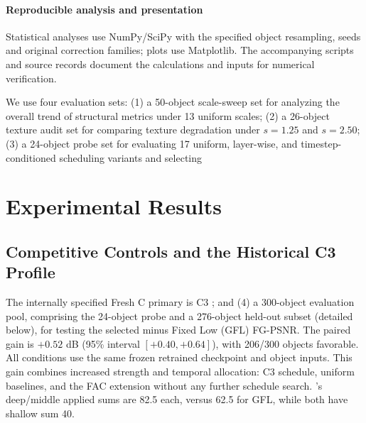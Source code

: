\documentclass[times,twocolumn,final]{elsarticle}
\providecommand{\DIFadd}[1]{{\protect\color{blue} \sf #1}} %
\providecommand{\DIFdel}[1]{{\protect\color{red} \scriptsize #1}} %
\providecommand{\DIFaddbegin}{} %
\providecommand{\DIFaddend}{} %
\providecommand{\DIFdelbegin}{} %
\providecommand{\DIFdelend}{} %
\begin{document}
\DIFdelbegin %
\DIFdelend \DIFaddbegin \paragraph{Reproducible analysis and presentation}
\DIFadd{Statistical analyses use NumPy/SciPy with the specified object resampling, seeds and original correction families; plots use Matplotlib. The accompanying scripts and source records document the calculations and inputs for numerical verification.
}\DIFaddend

\DIFdelbegin \DIFdel{We use four evaluation sets: (1) a 50-object scale-sweep set for analyzing the overall trend of structural metrics under 13 uniform scales; (2) a 26-object texture audit set for comparing texture degradation under $s = 1.25$ and $s = 2.50$; (3) a 24-object probe set for evaluating 17 uniform, layer-wise, and timestep-conditioned scheduling variants and selecting }\DIFdelend \DIFaddbegin \section{Experimental Results}
\label{sec:experiments}

\subsection{Competitive Controls and the Historical C3 Profile}
\label{subsec:largescale}

\DIFadd{The internally specified Fresh C primary is }\DIFaddend C3 \DIFdelbegin \DIFdel{; and (4) a 300-object evaluation pool, comprising the 24-object probe and a 276-object held-out subset (detailed below), for testing the selected }\DIFdelend \DIFaddbegin \DIFadd{minus Fixed Low (GFL) FG-PSNR. The paired gain is $+0.52$ dB (95\% interval $[+0.40,+0.64]$), with 206/300 objects favorable. All conditions use the same frozen retrained checkpoint and object inputs. This gain combines increased strength and temporal allocation: }\DIFaddend C3\DIFdelbegin \DIFdel{schedule, uniform baselines, and the FAC extension without any further schedule search. }\DIFdelend \DIFaddbegin \DIFadd{'s deep/middle applied sums are 82.5 each, versus 62.5 for GFL, while both have shallow sum 40.
}\DIFaddend
\end{document}
